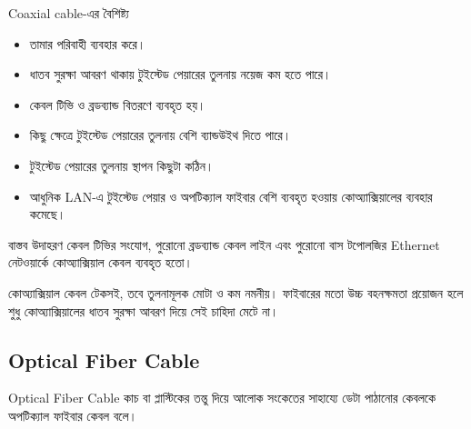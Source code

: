 

\begin{keypointbox}{Coaxial cable-এর বৈশিষ্ট্য}
\begin{itemize}
\item তামার পরিবাহী ব্যবহার করে।
\item ধাতব সুরক্ষা আবরণ থাকায় টুইস্টেড পেয়ারের তুলনায় নয়েজ কম হতে পারে।
\item কেবল টিভি ও ব্রডব্যান্ড বিতরণে ব্যবহৃত হয়।
\item কিছু ক্ষেত্রে টুইস্টেড পেয়ারের তুলনায় বেশি ব্যান্ডউইথ দিতে পারে।
\item টুইস্টেড পেয়ারের তুলনায় স্থাপন কিছুটা কঠিন।
\item আধুনিক LAN-এ টুইস্টেড পেয়ার ও অপটিক্যাল ফাইবার বেশি ব্যবহৃত হওয়ায় কোঅ্যাক্সিয়ালের ব্যবহার কমেছে।
\end{itemize}
\end{keypointbox}

\begin{examplebox}{বাস্তব উদাহরণ}
কেবল টিভির সংযোগ, পুরোনো ব্রডব্যান্ড কেবল লাইন এবং পুরোনো বাস টপোলজির Ethernet নেটওয়ার্কে কোঅ্যাক্সিয়াল কেবল ব্যবহৃত হতো।
\end{examplebox}

কোঅ্যাক্সিয়াল কেবল টেকসই, তবে তুলনামূলক মোটা ও কম নমনীয়। ফাইবারের মতো উচ্চ বহনক্ষমতা প্রয়োজন হলে শুধু কোঅ্যাক্সিয়ালের ধাতব সুরক্ষা আবরণ দিয়ে সেই চাহিদা মেটে না।

\subsection{Optical Fiber Cable}

\begin{definitionbox}{Optical Fiber Cable}
কাচ বা প্লাস্টিকের তন্তু দিয়ে আলোক সংকেতের সাহায্যে ডেটা পাঠানোর কেবলকে অপটিক্যাল ফাইবার কেবল বলে।
\end{definitionbox}

